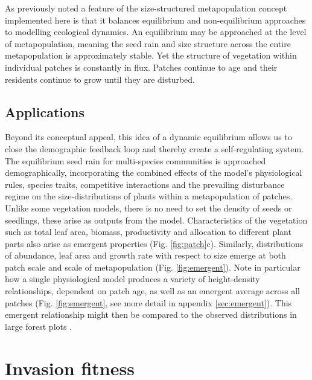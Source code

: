 \documentclass[a4paper,11pt]{article}
\begin{document}
As previously noted \citep{Kohyama-1993, Moorcroft-2001, Falster-2011} a
feature of the size-structured metapopulation concept implemented here
is that it balances equilibrium and non-equilibrium approaches to
modelling ecological dynamics. An
equilibrium may be approached at the level of metapopulation, meaning
the seed rain and size structure across the entire metapopulation is
approximately stable. Yet the structure of vegetation within individual
patches is constantly in flux. Patches continue to age and their
residents continue to grow until they are disturbed.

\subsection{Applications}

Beyond its conceptual appeal, this idea of a dynamic equilibrium
allows us to close the demographic feedback loop and thereby create a
self-regulating system. The equilibrium seed rain for multi-species
communities is approached demographically, incorporating the combined
effects of the model's physiological rules, species traits,
competitive interactions and the prevailing disturbance regime on the
size-distributions of plants within a metapopulation of
patches. Unlike some vegetation models, there is no need to set the
density of seeds or seedlings, these arise as outputs from the
model. Characteristics of the vegetation such as total leaf area,
biomass, productivity and allocation to different plant parts also
arise as emergent properties (Fig.  \ref{fig:patch}c). Similarly,
distributions of abundance, leaf area and growth rate with respect to
size emerge at both patch scale and scale of metapopulation
(Fig. \ref{fig:emergent}). Note in particular how a single
physiological model produces a variety of height-density
relationships, dependent on patch age, as well as an emergent average
across all patches (Fig. \ref{fig:emergent}, see more detail in
appendix \ref{sec:emergent}). This emergent relationship might then be
compared to the observed distributions in large forest plots
\citep{Muller-2006}.

\section{Invasion fitness}
\end{document}
